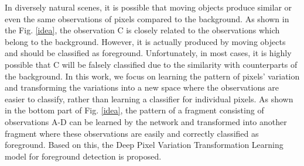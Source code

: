\documentclass[journal]{IEEEtran}
\newcommand{\reffig}[1]{Fig. \ref{#1}}
\begin{document}
In diversely natural scenes,
it is possible that moving objects produce similar or even the same observations of pixels compared to the background.
As shown in the \reffig{idea},
the observation C is closely related to the observations which belong to the background. However, it is actually produced by moving objects and should be classified as foreground.
Unfortunately, in most cases, it is highly possible that C will be falsely classified due to the similarity with counterparts of the background.
In this work, we focus on learning the pattern of pixels' variation and transforming the variations into a new space where the observations are easier to classify, rather than learning a classifier for individual pixels.
As shown in the bottom part of \reffig{idea}, the pattern of a fragment consisting of observations A-D can be learned by the network and transformed into another fragment where these observations are easily and correctly classified as foreground.
Based on this, the Deep Pixel Variation Transformation Learning model for foreground detection is proposed.
\end{document}
